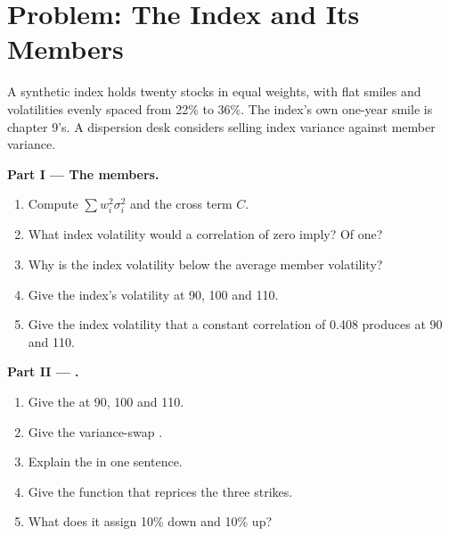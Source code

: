 \section{Problem: The Index and Its Members}

\begin{problem}\label{pb:dv:multi-asset-options:1}
A synthetic index holds twenty stocks in equal weights, with flat smiles and volatilities evenly spaced from 22\% to 36\%. The
index's own one-year smile is chapter 9's. A dispersion desk considers selling index variance against member variance.

\medskip\noindent\textbf{Part I --- The members.}
\begin{enumerate}
\item Compute $\sum w_i^2\sigma_i^2$ and the cross term $C$.
\item What index volatility would a correlation of zero imply? Of one?
\item Why is the index volatility below the average member volatility?
\item Give the index's volatility at 90, 100 and 110.
\item Give the index volatility that a constant correlation of 0.408 produces at 90 and 110.
\end{enumerate}

\medskip\noindent\textbf{Part II --- .}
\begin{enumerate}[resume]
\item Give the  at 90, 100 and 110.
\item Give the variance-swap .
\item Explain the  in one sentence.
\item Give the  function that reprices the three strikes.
\item What  does it assign 10\% down and 10\% up?
\end{enumerate}


\end{problem}
